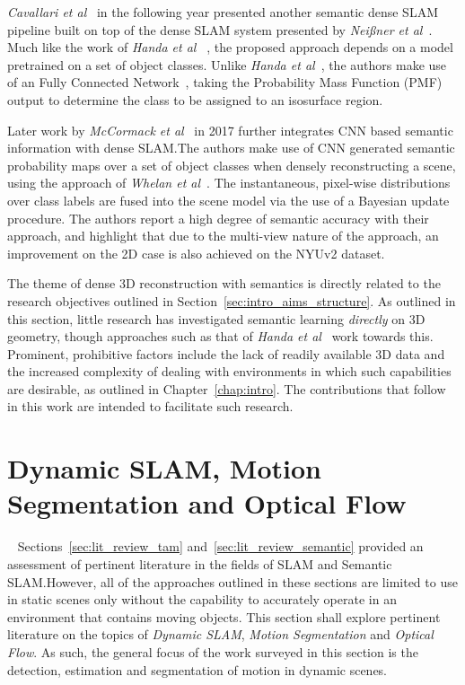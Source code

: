 \textit{Cavallari et al}~\cite{Cavallari2016} in the following year presented another 
semantic dense SLAM pipeline built on top of the dense SLAM system presented by 
\textit{Nei{\ss}ner et al}~\cite{NieBner2013}. Much like the work of \textit{Handa et al} 
~\cite{Handa2015}, the proposed approach depends on a model pretrained on a set of object 
classes. Unlike \textit{Handa et al}~\cite{Handa2015}, the authors make use of an 
Fully Connected Network~\cite{Long2015}, taking the Probability Mass Function (PMF) 
output to determine the class to be assigned to an isosurface region.

Later work by \textit{McCormack et al}~\cite{McCormac2017} in 2017 further integrates CNN based 
semantic information with dense SLAM.\@ The authors make use of CNN generated semantic probability 
maps over a set of object classes when densely reconstructing a scene, using the approach of 
\textit{Whelan et al}~\cite{Whelan2016}. The instantaneous, pixel-wise distributions over class labels 
are fused into the scene model via the use of a Bayesian update procedure. The authors report a high 
degree of semantic accuracy with their approach, and highlight that due to the multi-view nature of the 
approach, an improvement on the 2D case is also achieved on the NYUv2 dataset.

The theme of dense 3D reconstruction with semantics is directly related to the research objectives 
outlined in Section~\ref{sec:intro_aims_structure}. As outlined in this section, little research has 
investigated semantic learning \textit{directly} on 3D geometry, though approaches such as that of 
\textit{Handa et al}~\cite{Handa2015} work towards this. Prominent, prohibitive factors include the 
lack of readily available 3D data and the increased complexity of dealing with environments in which 
such capabilities are desirable, as outlined in Chapter~\ref{chap:intro}. The contributions that follow 
in this work are intended to facilitate such research.

\section{Dynamic SLAM, Motion Segmentation and Optical Flow}
~\label{sec:lit_review_dynamic}
Sections~\ref{sec:lit_review_tam} and~\ref{sec:lit_review_semantic} provided an assessment 
of pertinent literature in the fields of SLAM and Semantic SLAM.\@ However, all of the 
approaches outlined in these sections are limited to use in static scenes only without 
the capability to accurately operate in an environment that contains moving objects. This 
section shall explore pertinent literature on the topics of \textit{Dynamic SLAM}, 
\textit{Motion Segmentation} and \textit{Optical Flow}. As such, the general focus of the 
work surveyed in this section is the detection, estimation and segmentation of motion in 
dynamic scenes.

